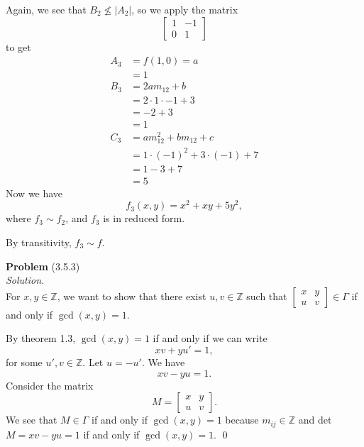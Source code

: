 \documentclass[12 pt]{amsart}
\begin{document}
  Again, we see that $B_2 \not \leq |A_2|$, so we apply the matrix
  \[
    \begin{bmatrix} 1 & -1 \\ 0 & 1 \end{bmatrix}
  \]
  to get
  \begin{align*}
    A_3 &= f(1,0) = a  \\
      &= 1\\
    B_3 &= 2am_{12} + b \\
      &= 2\cdot 1 \cdot -1 + 3 \\
      &= -2 + 3 \\
      &= 1 \\
    C_3 &= am_{12}^2 + bm_{12} + c \\
      &= 1 \cdot (-1)^2 + 3 \cdot (-1) + 7 \\
      &= 1 - 3 + 7 \\
      &= 5
  \end{align*}
  Now we have 
  \[
    f_3(x,y) = x^2 + xy + 5y^2,
  \]
  where $f_3 \sim f_2$, and $f_3$ is in reduced form.

  By transitivity, $f_3 \sim f$.



\vfill
\newpage



\phantom{\quad} \vfill
\noindent
\textbf{Problem} (3.5.3) \\[4ex]
\emph{Solution.} \\[2ex]
  For $x,y \in \mathbb{Z}$, we want to show that 
  there exist $u,v \in \mathbb{Z}$ such that
  $
  \begin{bmatrix}
    x & y \\ u & v 
  \end{bmatrix}
  \in \Gamma
  $
  if and only if 
  $\gcd(x,y) = 1$.

  By theorem 1.3, 
  $\gcd(x,y) = 1$ if and only if we can 
  write
  \[
    xv + yu' = 1,
  \]
  for some $u',v \in \mathbb{Z}$.
  Let $u = -u'$. 
  We have
  \[
    xv - yu = 1.
  \]
  Consider the matrix
  \[
    M = 
    \begin{bmatrix}
      x & y \\
      u & v
    \end{bmatrix}.
  \]
  We see that $M \in \Gamma$
  if and only if $\gcd(x,y) = 1$
  because
  $m_{ij} \in \mathbb{Z}$ and
  det $M = xv - yu = 1$ if and only if
  $\gcd(x,y) = 1$.
  \qed

\vfill
\newpage
\end{document}
